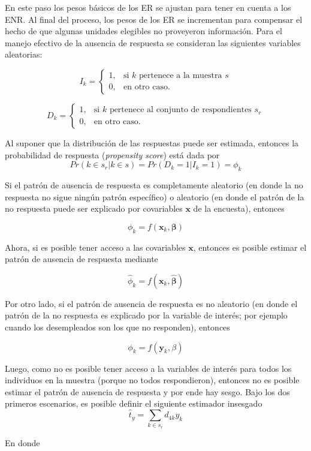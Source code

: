 \documentclass[
  12pt,
  spanish,
]{book}
\begin{document}
En este paso los pesos básicos de los ER se ajustan para tener en cuenta a los ENR. Al final del proceso, los pesos de los ER se incrementan para compensar el hecho de que algunas unidades elegibles no proveyeron información. Para el manejo efectivo de la ausencia de respuesta se consideran las siguientes variables aleatorias:

\[
I_k=
\begin{cases}
1,  &\text{si $k$ pertenece a la muestra $s$}\\
0,  &\text{en otro caso.}
\end{cases}
\]

\[
D_k=
\begin{cases}
1,  &\text{si $k$ pertenece al conjunto de respondientes $s_r$}\\
0,  &\text{en otro caso.}
\end{cases}
\]

Al suponer que la distribución de las respuestas puede ser estimada, entonces la probabilidad de respuesta (\emph{propensity score}) está dada por
\[
Pr(k\in s_r|k\in s)=Pr(D_k = 1|I_k = 1)=\phi_k 
\]

Si el patrón de ausencia de respuesta es completamente aleatorio (en donde la no respuesta no sigue ningún patrón específico) o aleatorio (en donde el patrón de la no respuesta puede ser explicado por covariables \(\mathbf{x}\) de la encuesta), entonces

\[
\phi_k = f(\mathbf{x}_k, \boldsymbol{\beta})
\]

Ahora, si es posible tener acceso a las covariables \(\mathbf{x}\), entonces es posible estimar el patrón de ausencia de respuesta mediante

\[
\hat{\phi}_k = f(\mathbf{x}_k, \hat{\boldsymbol{\beta}})
\]

Por otro lado, si el patrón de ausencia de respuesta es no aleatorio (en donde el patrón de la no respuesta es explicado por la variable de interés; por ejemplo cuando los desempleados son los que no responden), entonces

\[
\phi_k = f(\mathbf{y}_k, \beta)
\]

Luego, como no es posible tener acceso a la variables de interés para todos los individuos en la muestra (porque no todos respondieron), entonces no es posible estimar el patrón de ausencia de respuesta y por ende hay sesgo. Bajo los dos primeros escenarios, es posible definir el siguiente estimador insesgado
\[
\hat{t}_y=\sum_{k\in s_r}d_{4k}y_k
\]

En donde
\end{document}

